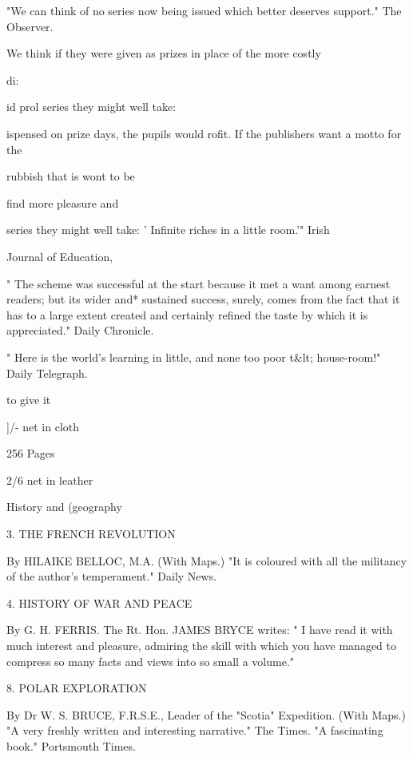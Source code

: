 \documentclass[12pt,leqno]{book}[2005/09/16]
\begin{document}
"We can think of no series now being issued which better deserves
support." The Observer.



We think if they were given as prizes in place of the more costly

di:

id prol
series they might well take:



ispensed on prize days, the pupils would
rofit. If the publishers want a motto for the



rubbish that is wont to be

find more pleasure and

series they might well take: ' Infinite riches in a little room.'" Irish

Journal of Education,

" The scheme was successful at the start because it met a want
among earnest readers; but its wider and* sustained success, surely,
comes from the fact that it has to a large extent created and certainly
refined the taste by which it is appreciated." Daily Chronicle.

" Here is the world's learning in little, and none too poor t&lt;
house-room!" Daily Telegraph.



to give it



]/- net
in cloth


256 Pages


2/6 net
in leather



History and (geography



3. THE FRENCH REVOLUTION

By HILAIKE BELLOC, M.A. (With Maps.) "It is coloured with all the
militancy of the author's temperament." Daily News.

4. HISTORY OF WAR AND PEACE

By G. H. FERRIS. The Rt. Hon. JAMES BRYCE writes: " I have read it with
much interest and pleasure, admiring the skill with which you have managed
to compress so many facts and views into so small a volume."

8. POLAR EXPLORATION

By Dr W. S. BRUCE, F.R.S.E., Leader of the "Scotia" Expedition. (With
Maps.) "A very freshly written and interesting narrative." The Times.
"A fascinating book." Portsmouth Times.
\end{document}
